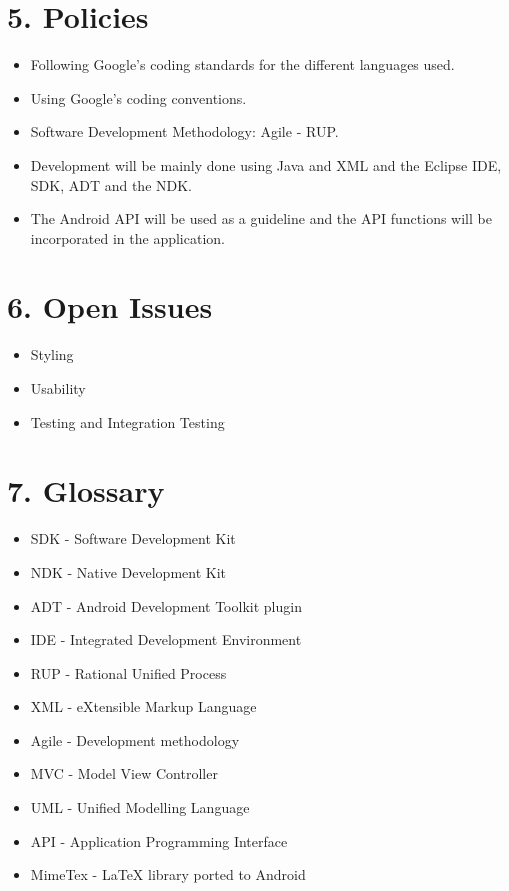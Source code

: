 \documentclass[29pt,a4paper]{moderncv}
\begin{document}
	\section*{\textbf{5. Policies}}
	\vspace{4mm}
		\begin{itemize}
			\item Following Google’s coding standards for the different languages used.
			\item Using Google’s coding conventions.
			\item Software Development Methodology: Agile - RUP.
			\item Development will be mainly done using Java and XML and the Eclipse IDE, SDK, ADT and the NDK.
			\item The Android API will be used as a guideline and the API functions will be incorporated in the application.
			
		\end{itemize}	
	\vspace{5mm}
\newpage	
	\section*{\textbf{6. Open Issues}}
	\vspace{4mm}
		\begin{itemize}
			\item Styling
			\item Usability
			\item Testing and Integration Testing
			
		\end{itemize}
	\vspace{5mm}
	\newpage
	\section*{\textbf{7. Glossary}}
	\vspace{4mm}
		\begin{itemize}
			\item SDK - Software Development Kit
			\item NDK - Native Development Kit
			\item ADT - Android Development Toolkit plugin
			\item IDE - Integrated Development Environment
			\item RUP - Rational Unified Process
			\item XML - eXtensible Markup Language
			\item Agile - Development methodology
			\item MVC - Model View Controller
			\item UML - Unified Modelling Language
			\item API - Application Programming Interface
			\item MimeTex - LaTeX library ported to Android
			
		\end{itemize}
	\vspace{5mm}
\end{document}
